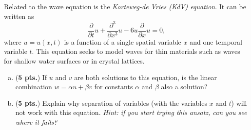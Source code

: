 \documentclass[12pt]{amsbook}
\begin{document}
\newpage
\begin{problem}
   Related to the wave equation is the \emph{Korteweg-de Vries (KdV) equation}.  It can be written as
   \[
   \frac{\partial}{\partial t} u +  \frac{\partial^3}{\partial x^3} u - 6 u \frac{\partial}{\partial x}u = 0,
   \]
   where $u=u(x,t)$ is a function of a single spatial variable $x$ and one temporal variable $t$. This equation seeks to model waves for thin materials such as waves for shallow water surfaces or in crystal lattices.
   \vspace*{.5cm}
   \begin{enumerate}[(a)]
        \item (\textbf{5 pts.}) If $u$ and $v$ are both solutions to this equation, is the linear combination $w=\alpha u + \beta v$ for constants $\alpha$ and $\beta$ also a solution?
        \vspace*{.5cm}
        \item (\textbf{5 pts.}) Explain why separation of variables (with the variables $x$ and $t$) will not work with this equation. \emph{Hint: if you start trying this ansatz, can you see where it fails?}
        \vspace*{.5cm}
   \end{enumerate}
\end{problem}
\end{document}
